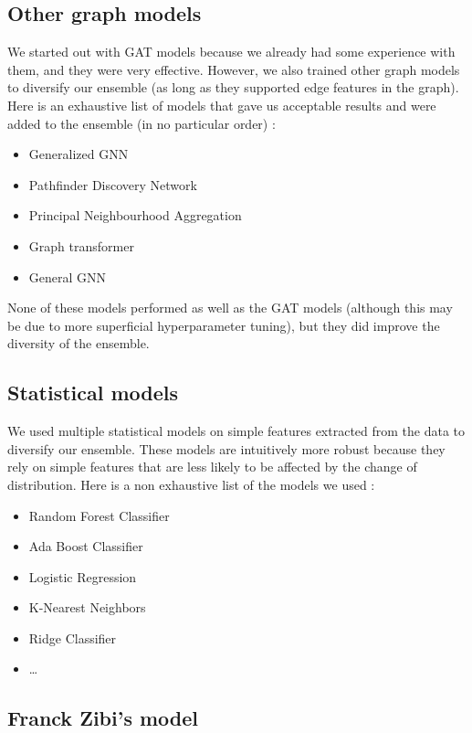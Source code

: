 \documentclass[switch, 11pt]{article}
\begin{document}
\begin{multicols}{2}
    \subsection{Other graph models}

    We started out with GAT models because we already had some experience with them, and they were very effective. However, we also trained other graph models to diversify our ensemble (as long as they supported edge features in the graph). Here is an exhaustive list of models that gave us acceptable results and were added to the ensemble (in no particular order) :
    \begin{itemize}
        \item Generalized GNN \cite{li-2020}
        \item Pathfinder Discovery Network \cite{rozemberczki-2021}
        \item Principal Neighbourhood Aggregation \cite{corso-2020}
        \item Graph transformer \cite{shi-2020}
        \item General GNN \cite{you-2020}
    \end{itemize}

    None of these models performed as well as the GAT models (although this may be due to more superficial hyperparameter tuning), but they did improve the diversity of the ensemble.

    \subsection{Statistical models}

    We used multiple statistical models on simple features extracted from the data to diversify our ensemble. These models are intuitively more robust because they rely on simple features that are less likely to be affected by the change of distribution. Here is a non exhaustive list of the models we used :
    \begin{itemize}
        \item Random Forest Classifier
        \item Ada Boost Classifier
        \item Logistic Regression
        \item K-Nearest Neighbors
        \item Ridge Classifier
        \item \dots
    \end{itemize}

    \subsection{Franck Zibi's model}


\end{multicols}
\end{document}
